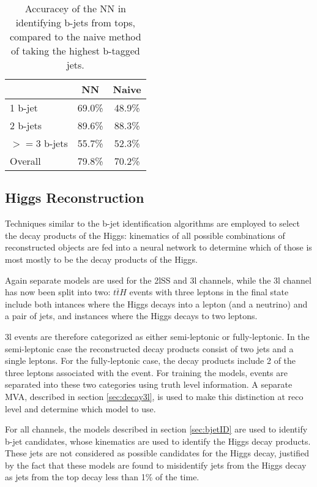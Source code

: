 \begin{table}[h]
\centering
\caption{Accuracey of the NN in identifying b-jets from tops, compared to the naive method of taking the highest b-tagged jets.}
\begin{tabular}{l|c|c}
\hline\hline
& NN & Naive \\
\hline
1 b-jet    & 69.0\% & 48.9\% \\
2 b-jets   & 89.6\% & 88.3\% \\
$>=$3 b-jets & 55.7\% & 52.3\% \\
\hline
Overall & 79.8\% & 70.2\% \\
\hline\hline
\end{tabular}
\label{tab:topMatchAcc3l}
\end{table}


\subsection{Higgs Reconstruction}
\label{sec:higgsID}

Techniques similar to the b-jet identification algorithms are employed to select the decay products of the Higgs: kinematics of all possible combinations of reconstructed objects are fed into a neural network to determine which of those is most mostly to be the decay products of the Higgs.

Again separate models are used for the 2lSS and 3l channels, while the 3l channel has now been split into two: $t\bar{t}H$ events with three leptons in the final state include both intances where the Higgs decays into a lepton (and a neutrino) and a pair of jets, and instances where the Higgs decays to two leptons.

3l events are therefore categorized as either semi-leptonic or fully-leptonic. In the semi-leptonic case the reconstructed decay products consist of two jets and a single leptons. For the fully-leptonic case, the decay products include 2 of the three leptons associated with the event. For training the models, events are separated into these two categories using truth level information. A separate MVA, described in section \ref{sec:decay3l}, is used to make this distinction at reco level and determine which model to use.

For all channels, the models described in section \ref{sec:bjetID} are used to identify b-jet candidates, whose kinematics are used to identify the Higgs decay products. These jets are not considered as possible candidates for the Higgs decay, justified by the fact that these models are found to misidentify jets from the Higgs decay as jets from the top decay less than 1\% of the time.

